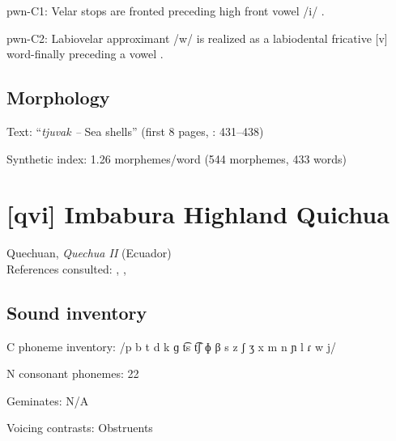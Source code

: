 {\begin{appendixdesc}
\item[pwn-C1:] Velar stops are fronted preceding high front vowel /i/ \citep[22]{Chang2006}.

\item[pwn-C2:] Labiovelar approximant /w/ is realized as a labiodental fricative [v] word-finally preceding a vowel \citep[40]{Chang2006}.
\end{appendixdesc}
\subsection*{Morphology}

\begin{appendixdesc}

\item[Text:] “\textit{tjuvak --} Sea shells” (first 8 pages, \citealt{Chang2006}: 431--438)

\item[Synthetic index:] 1.26 morphemes/word (544 morphemes, 433 words)
\end{appendixdesc}
\section*{[qvi] Imbabura Highland Quichua}  %
Quechuan, \textit{Quechua II} (Ecuador)\medskip\\
References consulted: \citet{Carpenter1982}, \citet{Cole1982}, \citet{Jake1983}

\subsection*{Sound inventory}
\begin{appendixdesc}

\item[C phoneme inventory:] /p b t d k ɡ t͡s t͡ʃ ɸ β s z ʃ ʒ x m n ɲ l ɾ w j/

\item[N consonant phonemes:] 22

\item[Geminates:] N/A

\item[Voicing contrasts:] Obstruents


\end{appendixdesc}}
